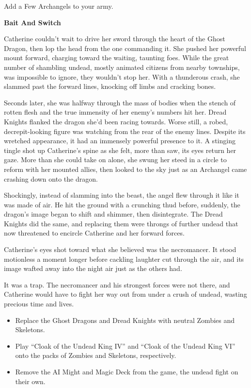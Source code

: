 \begin{multicols*}{2}
\textcolor{darkcandyapplered}{Add a Few Archangels to your army.}

\textbf{Bait And Switch}

Catherine couldn't wait to drive her sword through the heart of the Ghost Dragon, then lop the head from the one commanding it.
She pushed her powerful mount forward, charging toward the waiting, taunting foes.
While the great number of shambling undead, mostly animated citizens from nearby townships, was impossible to ignore, they wouldn't stop her.
With a thunderous crash, she slammed past the forward lines, knocking off limbs and cracking bones.

Seconds later, she was halfway through the mass of bodies when the stench of rotten flesh and the true immensity of her enemy's numbers hit her.
Dread Knights flanked the dragon she'd been racing towards.
Worse still, a robed, decrepit-looking figure was watching from the rear of the enemy lines.
Despite its wretched appearance, it had an immensely powerful presence to it.
A stinging tingle shot up Catherine's spine as she felt, more than saw, its eyes return her gaze.
More than she could take on alone, she swung her steed in a circle to reform with her mounted allies, then looked to the sky just as an Archangel came crashing down onto the dragon.

Shockingly, instead of slamming into the beast, the angel flew through it like it was made of air.
He hit the ground with a crunching thud before, suddenly, the dragon's image began to shift and shimmer, then disintegrate.
The Dread Knights did the same, and replacing them were throngs of further undead that now threatened to encircle Catherine and her forward forces.

Catherine's eyes shot toward what she believed was the necromancer.
It stood motionless a moment longer before cackling laughter cut through the air, and its image wafted away into the night air just as the others had.

It was a trap.
The necromancer and his strongest forces were not there, and Catherine would have to fight her way out from under a crush of undead, wasting precious time and lives.

\begin{itemize}
  \item \textcolor{darkcandyapplered}{Replace the Ghost Dragons and Dread Knights with  neutral Zombies and Skeletons.}
  \item \textcolor{darkcandyapplered}{Play ``Cloak of the Undead King IV'' and ``Cloak of the Undead King VI'' onto the packs of Zombies and Skeletons, respectively.}
  \item \textcolor{darkcandyapplered}{Remove the AI Might and Magic Deck from the game, the undead fight on their own.}
\end{itemize}



\end{multicols*}
